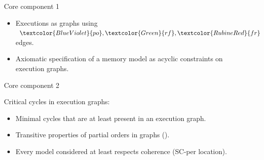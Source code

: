 \documentclass[notes, xcolor=dvipsnames]{beamer}
\newcommand{\po}{\textcolor{BlueViolet}{po}}
\newcommand{\rf}{\textcolor{Green}{rf}}
\newcommand{\fr}{\textcolor{RubineRed}{fr}}
\begin{document}
    \begin{frame}{Core component 1}

        \begin{itemize}
            \item Executions as graphs using $\po, \rf, \fr$ edges.
            \item Axiomatic specification of a memory model as acyclic constraints on execution graphs.
        \end{itemize}

        \begin{figure}
        \end{figure}


    \end{frame}



    \begin{frame}{Core component 2} 

        Critical cycles in execution graphs:
        \begin{itemize}
            \item Minimal cycles that are at least present in an execution graph.
            \item Transitive properties of partial orders in graphs ().
            \item Every model considered at least respects coherence (SC-per location).
        \end{itemize}
        
    \end{frame}
\end{document}
